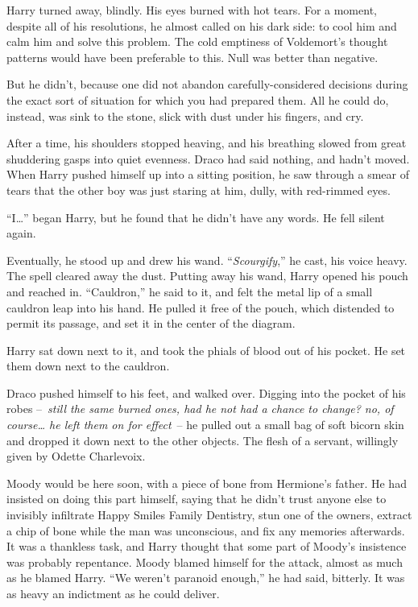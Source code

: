 Harry turned away, blindly. His eyes burned with hot tears. For a
moment, despite all of his resolutions, he almost called on his dark
side: to cool him and calm him and solve this problem. The cold
emptiness of Voldemort's thought patterns would have been preferable to
this. Null was better than negative.

But he didn't, because one did not abandon carefully-considered
decisions during the exact sort of situation for which you had prepared
them. All he could do, instead, was sink to the stone, slick with dust
under his fingers, and cry.

After a time, his shoulders stopped heaving, and his breathing slowed
from great shuddering gasps into quiet evenness. Draco had said nothing,
and hadn't moved. When Harry pushed himself up into a sitting position,
he saw through a smear of tears that the other boy was just staring at
him, dully, with red-rimmed eyes.

``I\ldots{}'' began Harry, but he found that he didn't have any words.
He fell silent again.

Eventually, he stood up and drew his wand. ``\emph{Scourgify},'' he
cast, his voice heavy. The spell cleared away the dust. Putting away his
wand, Harry opened his pouch and reached in. ``Cauldron,'' he said to
it, and felt the metal lip of a small cauldron leap into his hand. He
pulled it free of the pouch, which distended to permit its passage, and
set it in the center of the diagram.

Harry sat down next to it, and took the phials of blood out of his
pocket. He set them down next to the cauldron.

Draco pushed himself to his feet, and walked over. Digging into the
pocket of his robes --~\emph{still the same burned ones, had he not had
a chance to change? no, of course\ldots{} he left them on for effect}~--
he pulled out a small bag of soft bicorn skin and dropped it down next
to the other objects. The flesh of a servant, willingly given by Odette
Charlevoix.

Moody would be here soon, with a piece of bone from Hermione's father.
He had insisted on doing this part himself, saying that he didn't trust
anyone else to invisibly infiltrate Happy Smiles Family Dentistry, stun
one of the owners, extract a chip of bone while the man was unconscious,
and fix any memories afterwards. It was a thankless task, and Harry
thought that some part of Moody's insistence was probably repentance.
Moody blamed himself for the attack, almost as much as he blamed Harry.
``We weren't paranoid enough,'' he had said, bitterly. It was as heavy
an indictment as he could deliver.

